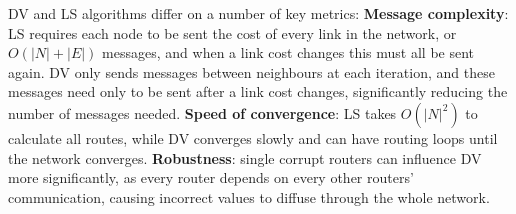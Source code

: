 DV and LS algorithms differ on a number of key metrics: \textbf{Message complexity}: LS requires each node to be sent the cost of every link in the network, or $O(|N|+|E|)$ messages, and when a link cost changes this must all be sent again. DV only sends messages between neighbours at each iteration, and these messages need only to be sent after a link cost changes, significantly reducing the number of messages needed. \textbf{Speed of convergence}: LS takes $O(|N|^2)$ to calculate all routes, while DV converges slowly and can have routing loops until the network converges. \textbf{Robustness}: single corrupt routers can influence DV more significantly, as every router depends on every other routers' communication, causing incorrect values to diffuse through the whole network.\\

